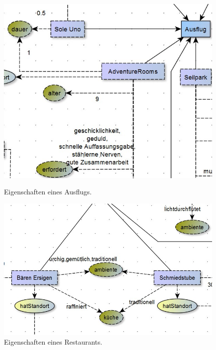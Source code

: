\begin{figure}[H]%
    \begin{minipage}[hbt]{0,49\textwidth}
        \centering
        \includegraphics[scale=0.3]{bilder/charAusflug.jpg}
        \caption{Eigenschaften eines Ausflugs.\label{fig:charAusflug}\protect\footnotemark}
    \end{minipage}
    \begin{minipage}[hbt]{0,49\textwidth}
        \centering
        \includegraphics[scale=0.3]{bilder/charRestaurant.jpg}
        \caption{Eigenschaften eines Restaurants.\label{fig:charRest}\protect\footnotemark[1]}
    \end{minipage}
\end{figure}


